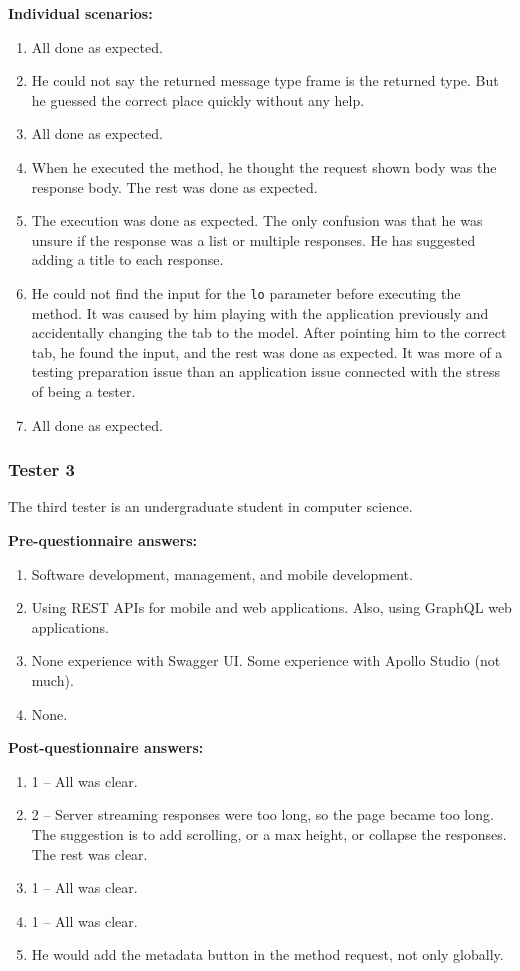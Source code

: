 \textbf{Individual scenarios:}
\begin{enumerate}
    \item All done as expected.
    \item He could not say the returned message type frame is the returned type.
    But he guessed the correct place quickly without any help.
    \item All done as expected.
    \item When he executed the method, he thought the request shown body was the response body.
    The rest was done as expected.
    \item The execution was done as expected.
    The only confusion was that he was unsure if the response was a list or multiple responses.
    He has suggested adding a title to each response.
    \item He could not find the input for the \texttt{lo} parameter before executing the method.
    It was caused by him playing with the application previously and accidentally changing the tab to the model.
    After pointing him to the correct tab, he found the input, and the rest was done as expected.
    It was more of a testing preparation issue than an application issue connected with the stress of being a tester.
    \item All done as expected.
\end{enumerate}

\subsubsection{Tester 3}
The third tester is an undergraduate student in computer science.

\textbf{Pre-questionnaire answers:}
\begin{enumerate}
    \item Software development, management, and mobile development.
    \item Using REST APIs for mobile and web applications.
    Also, using GraphQL web applications.
    \item None experience with Swagger UI\@.
    Some experience with Apollo Studio (not much).
    \item None.
\end{enumerate}

\textbf{Post-questionnaire answers:}
\begin{enumerate}
    \item 1 -- All was clear.
    \item 2 -- Server streaming responses were too long, so the page became too long.
    The suggestion is to add scrolling, or a max height, or collapse the responses.
    The rest was clear.
    \item 1 -- All was clear.
    \item 1 -- All was clear.
    \item He would add the metadata button in the method request, not only globally.
\end{enumerate}

